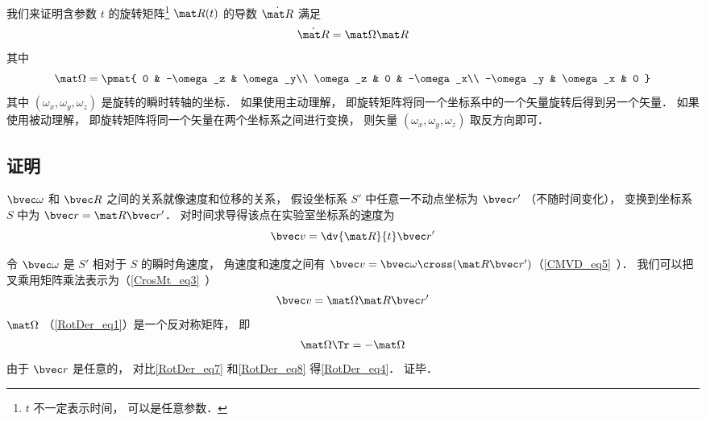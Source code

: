 

我们来证明含参数 $t$ 的旋转矩阵\footnote{$t$ 不一定表示时间， 可以是任意参数．} $\mat R(t)$ 的导数 $\dot{\mat R}$ 满足
\begin{equation}\label{RotDer_eq4}
\dot{\mat R} = \mat \Omega \mat R
\end{equation}
其中
\begin{equation}\label{RotDer_eq1}
\mat \Omega = \pmat{
0 & -\omega_z & \omega_y\\
\omega_z & 0 & -\omega_x\\
-\omega_y & \omega_x & 0
}
\end{equation}
其中 $(\omega_x, \omega_y, \omega_z)$ 是旋转的瞬时转轴的坐标． 如果使用主动理解， 即旋转矩阵将同一个坐标系中的一个矢量旋转后得到另一个矢量． 如果使用被动理解， 即旋转矩阵将同一个矢量在两个坐标系之间进行变换， 则矢量 $(\omega_x, \omega_y, \omega_z)$ 取反方向即可．

\subsection{证明}

$\bvec \omega$ 和 $\bvec R$ 之间的关系就像速度和位移的关系， 假设坐标系 $S'$ 中任意一不动点坐标为 $\bvec r'$ （不随时间变化）， 变换到坐标系 $S$ 中为 $\bvec r = \mat R \bvec r'$． 对时间求导得该点在实验室坐标系的速度为
\begin{equation}\label{RotDer_eq7}
\bvec v = \dv{\mat R}{t} \bvec r'
\end{equation}

令 $\bvec\omega$ 是 $S'$ 相对于 $S$ 的瞬时角速度， 角速度和速度之间有 $\bvec v = \bvec \omega \cross (\mat R \bvec r')$（\autoref{CMVD_eq5}~）． 我们可以把叉乘用矩阵乘法表示为（\autoref{CrosMt_eq3}~）
\begin{equation}\label{RotDer_eq8}
\bvec v = \mat\Omega \mat R \bvec r'
\end{equation}
$\mat\Omega$ （\autoref{RotDer_eq1}）是一个反对称矩阵， 即
\begin{equation}
\mat \Omega\Tr = -\mat \Omega
\end{equation}
由于 $\bvec r$ 是任意的， 对比\autoref{RotDer_eq7} 和\autoref{RotDer_eq8} 得\autoref{RotDer_eq4}． 证毕．
